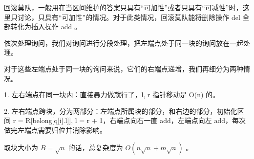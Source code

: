 回滚莫队，一般用在当区间维护的答案只具有“可加性”或者只具有“可减性”时，这里只讨论，只具有“可加性”的情况。对于此类情况，回滚莫队能将删除操作 del 全部转化为插入操作 add 。

依次处理询问，我们对询问进行分段处理，把左端点处于同一块的询问放在一起处理。

对于这些左端点处于同一块的询问来说，它们的右端点递增，我们再细分为两种情况。

1. 左右端点在同一块内：直接暴力做就行了，l, r 指针移动是 O(n) 的。

2. 左右端点跨块，分为两部分：左端点所属块的部分，和右边的部分，初始化区间 r = R[belong[q[i].l]], l = r + 1，右端点向右一直 add，左端点向左 add，每次做完左端点需要归位并消除影响。

取块大小为 $B=\sqrt{n}$ 的话，总复杂度为 $O(n\sqrt{n}+m\sqrt{n})$ 。

